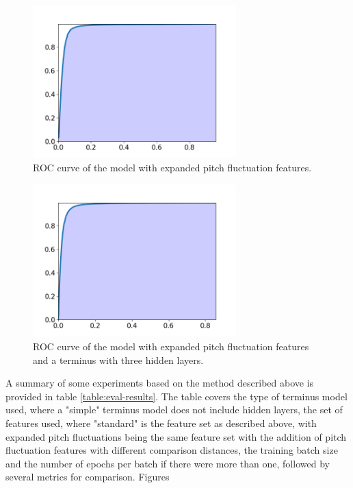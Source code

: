 \documentclass{article}
\begin{document}
		\begin{figure}[htbp]
			\centering
			\includegraphics[width=0.7\textwidth]{images/roc_mpf.png}
			\caption{ROC curve of the model with expanded pitch fluctuation features.}
			\label{fig:roc_mpf}
		\end{figure}
		\begin{figure}[htbp]
			\centering
			\includegraphics[width=0.7\textwidth]{images/roc_mpf_cterm.png}
			\caption{ROC curve of the model with expanded pitch fluctuation features and a
			terminus with three hidden layers.}
			\label{fig:roc_mpf_cterm}
		\end{figure}
		\sloppy
		A summary of some experiments based on the method described above is provided in table
		\ref{table:eval-results}. The table covers the type of terminus model used, where a
		"simple" terminus model does not include hidden layers, the set of features used, where
		"standard" is the feature set as described above, with expanded pitch fluctuations being
		the same feature set with the addition of pitch fluctuation features with different
		comparison distances, the training batch size and the number of epochs per batch if there
		were more than one, followed by several metrics for comparison. Figures
\end{document}
